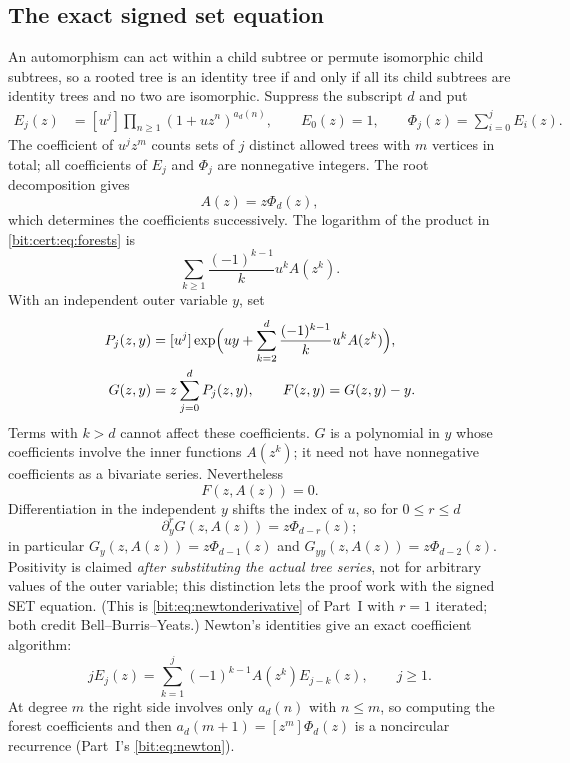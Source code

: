 \documentclass[11pt]{article}
\theoremstyle{definition}\newtheorem{definition}[theorem]{Definition}
\theoremstyle{remark}\newtheorem{remark}[theorem]{Remark}
\begin{document}
\subsection{The exact signed set equation}\label{bit:cert:sec:model}
An automorphism can act within a child subtree or permute isomorphic child
subtrees, so a rooted tree is an identity tree if and only if all its child
subtrees are identity trees and no two are isomorphic. Suppress the subscript
$d$ and put
\begin{align}
 E_j(z)&=[u^j]\prod_{n\ge1}(1+uz^n)^{a_d(n)},\qquad E_0(z)=1,\qquad
 \Phi_j(z)=\sum_{i=0}^j E_i(z).\label{bit:cert:eq:forests}
\end{align}
The coefficient of $u^jz^m$ counts sets of $j$ distinct allowed trees with
$m$ vertices in total; all coefficients of $E_j$ and $\Phi_j$ are nonnegative
integers. The root decomposition gives
\begin{equation}\label{bit:cert:eq:root}
 A(z)=z\Phi_d(z),
\end{equation}
which determines the coefficients successively. The logarithm of the product
in \eqref{bit:cert:eq:forests} is
\[
 \sum_{k\ge1}\frac{(-1)^{k-1}}{k}u^kA(z^k).
\]
With an independent outer variable $y$, set
\begin{align}
 P_j(z,y)&=[u^j]\exp\Bigl(uy+
        \sum_{k=2}^d\frac{(-1)^{k-1}}{k}u^kA(z^k)\Bigr),\label{bit:cert:eq:P}\\
 G(z,y)&=z\sum_{j=0}^dP_j(z,y),\qquad F(z,y)=G(z,y)-y.\label{bit:cert:eq:G}
\end{align}
Terms with $k>d$ cannot affect these coefficients. $G$ is a polynomial in $y$
whose coefficients involve the inner functions $A(z^k)$; it need not have
nonnegative coefficients as a bivariate series. Nevertheless
\begin{equation}\label{bit:cert:eq:functional}
 F(z,A(z))=0.
\end{equation}
Differentiation in the independent $y$ shifts the index of $u$, so for
$0\le r\le d$
\begin{equation}\label{bit:cert:eq:derivativeidentity}
 \partial_y^rG(z,A(z))=z\Phi_{d-r}(z);
\end{equation}
in particular $G_y(z,A(z))=z\Phi_{d-1}(z)$ and $G_{yy}(z,A(z))=z\Phi_{d-2}(z)$.
Positivity is claimed \emph{after substituting the actual tree series}, not
for arbitrary values of the outer variable; this distinction lets the proof
work with the signed SET equation. (This is \eqref{bit:eq:newtonderivative}
of Part~I with $r=1$ iterated; both credit Bell--Burris--Yeats.) Newton's
identities give an exact coefficient algorithm:
\begin{equation}\label{bit:cert:eq:newton}
 jE_j(z)=\sum_{k=1}^j(-1)^{k-1}A(z^k)E_{j-k}(z),\qquad j\ge1.
\end{equation}
At degree $m$ the right side involves only $a_d(n)$ with $n\le m$, so
computing the forest coefficients and then $a_d(m+1)=[z^m]\Phi_d(z)$ is a
noncircular recurrence (Part~I's \eqref{bit:eq:newton}).
\end{document}
